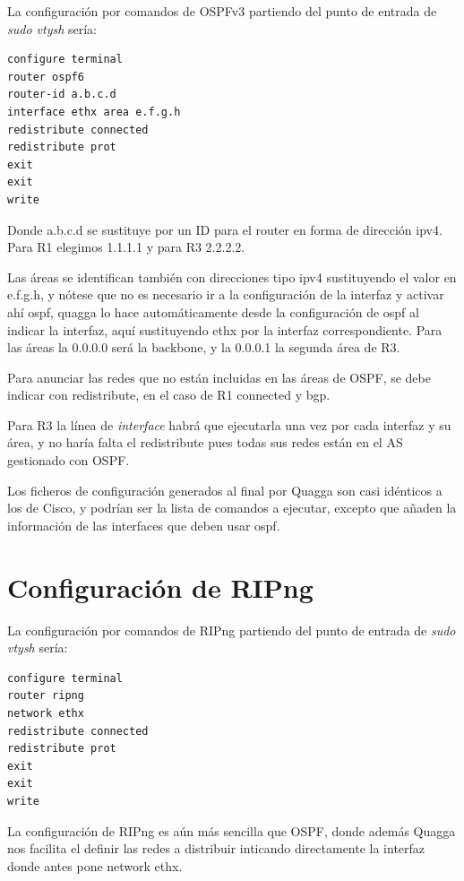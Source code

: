 \documentclass{article}
\begin{document}
La configuración por comandos de OSPFv3 partiendo del punto de entrada de \textit{sudo vtysh} sería:

\begin{lstlisting}
configure terminal
router ospf6
router-id a.b.c.d
interface ethx area e.f.g.h
redistribute connected
redistribute prot
exit
exit
write
\end{lstlisting}

Donde a.b.c.d se sustituye por un ID para el router en forma de dirección ipv4. Para R1 elegimos 1.1.1.1 y para R3 2.2.2.2.

Las áreas se identifican también con direcciones tipo ipv4 sustituyendo el valor en e.f.g.h, y nótese que no es necesario ir a la configuración de la interfaz y activar ahí ospf, quagga lo hace automáticamente desde la configuración de ospf al indicar la interfaz, aquí sustituyendo ethx por la interfaz correspondiente. Para las áreas la 0.0.0.0 será la backbone, y la 0.0.0.1 la segunda área de R3.

Para anunciar las redes que no están incluidas en las áreas de OSPF, se debe indicar con redistribute, en el caso de R1 connected y bgp.

Para R3 la línea de \textit{interface} habrá que ejecutarla una vez por cada interfaz y su área, y no haría falta el redistribute pues todas sus redes están en el AS gestionado con OSPF.

\hfill

Los ficheros de configuración generados al final por Quagga son casi idénticos a los de Cisco, y podrían ser la lista de comandos a ejecutar, excepto que añaden la información de las interfaces que deben usar ospf.



\section{Configuración de RIPng}

La configuración por comandos de RIPng partiendo del punto de entrada de \textit{sudo vtysh} sería:

\begin{lstlisting}
configure terminal
router ripng
network ethx
redistribute connected
redistribute prot
exit
exit
write
\end{lstlisting}

La configuración de RIPng es aún más sencilla que OSPF, donde además Quagga nos facilita el definir las redes a distribuir inticando directamente la interfaz donde antes pone network ethx.
\end{document}
